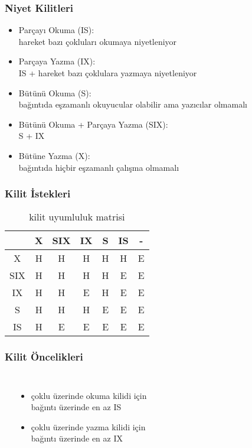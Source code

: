 \documentclass[dvipsnames]{beamer}
\theoremstyle{plain}
\begin{document}
\begin{frame}
  \frametitle{Niyet Kilitleri}

  \begin{itemize}
    \item Parçayı Okuma (IS):\\
      hareket bazı çokluları okumaya niyetleniyor

    \item Parçaya Yazma (IX):\\
      IS + hareket bazı çoklulara yazmaya niyetleniyor

    \item Bütünü Okuma (S):\\
      bağıntıda eşzamanlı okuyucular olabilir ama yazıcılar olmamalı

    \item Bütünü Okuma + Parçaya Yazma (SIX):\\
      S + IX

    \item Bütüne Yazma (X):\\
      bağıntıda hiçbir eşzamanlı çalışma olmamalı
  \end{itemize}
\end{frame}

\begin{frame}
  \frametitle{Kilit İstekleri}

    \begin{table}
    \caption{kilit uyumluluk matrisi}
      \begin{tabular}{|c||c|c|c|c|c|c|}\hline
    & X & SIX & IX & S & IS & -\\\hline\hline
  X & H &  H  & H  & H & H  & E\\\hline
SIX & H &  H  & H  & H & E  & E\\\hline
 IX & H &  H  & E  & H & E  & E\\\hline
  S & H &  H  & H  & E & E  & E\\\hline
 IS & H &  E  & E  & E & E  & E\\\hline
      \end{tabular}
    \end{table}
\end{frame}

\begin{frame}
  \frametitle{Kilit Öncelikleri}

  \begin{columns}[t]
    \begin{center}
    \end{center}

    \begin{itemize}
      \item çoklu üzerinde okuma kilidi için\\
	bağıntı üzerinde en az IS
      \item çoklu üzerinde yazma kilidi için\\
	bağıntı üzerinde en az IX
    \end{itemize}
  \end{columns}
\end{frame}
\end{document}
